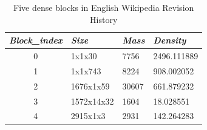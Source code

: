 \renewcommand{\arraystretch}{1.4}
\begin{table}[!ht]
\centering
\caption{Five dense blocks in English Wikipedia Revision History}
\label{tab:wikipedia}
\begin{tabular}{|c|p{2cm}|p{2cm}|p{3cm}|}
\hline
\textit{\textbf{Block\_index}} & \textit{\textbf{Size}} & \textit{\textbf{Mass}} & \textit{\textbf{Density}} \\ \hline
{0}                     & 1x1x30                 & 7756                               & 2496.111889                           \\ \hline
{1}                     & 1x1x743                 & 8224                               & 908.002052                           \\ \hline
{2}                     & 1676x1x59                 & 30607                               & 661.879232                          \\ \hline
{3}                     & 1572x14x32                  & 1604                                & 18.028551                           \\ \hline
{4}                     & 2915x1x3                 & 2931                              & 142.264283                           \\ \hline
\end{tabular}
\end{table}

